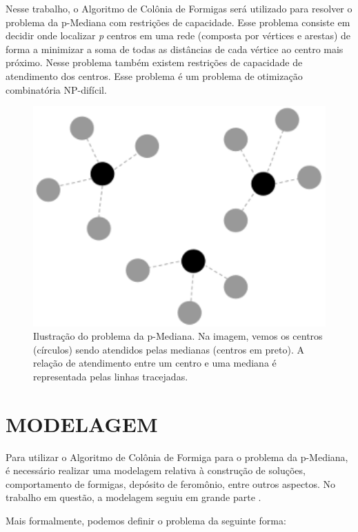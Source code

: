 \documentclass[12pt]{article}
\begin{document}
Nesse trabalho, o Algoritmo de Colônia de Formigas será utilizado para resolver o problema da p-Mediana
com restrições de capacidade. Esse problema consiste em decidir onde localizar \textit{p} centros em uma
rede (composta por vértices e arestas) de forma a minimizar a soma de todas as distâncias de cada vértice
ao centro mais próximo. Nesse problema também existem restrições de capacidade de atendimento dos centros.
Esse problema é um problema de otimização combinatória NP-difícil.

\begin{figure}[!htbp]
  \centering
  \includegraphics[width=1\textwidth]{pmedian.png}
  \caption{Ilustração do problema da p-Mediana. Na imagem, vemos os centros (círculos)
  sendo atendidos pelas medianas (centros em preto). A relação de atendimento entre um centro
  e uma mediana é representada pelas linhas tracejadas.}
  \label{fig:pmedian}
\end{figure}

\section{MODELAGEM} \label{sec:model}

Para utilizar o Algoritmo de Colônia de Formiga para o problema da p-Mediana, é necessário realizar uma
modelagem relativa à construção de soluções, comportamento de formigas, depósito de feromônio, entre outros
aspectos. No trabalho em questão, a modelagem seguiu em grande parte \cite{dblp:fr}.

Mais formalmente, podemos definir o problema da seguinte forma:
\end{document}
